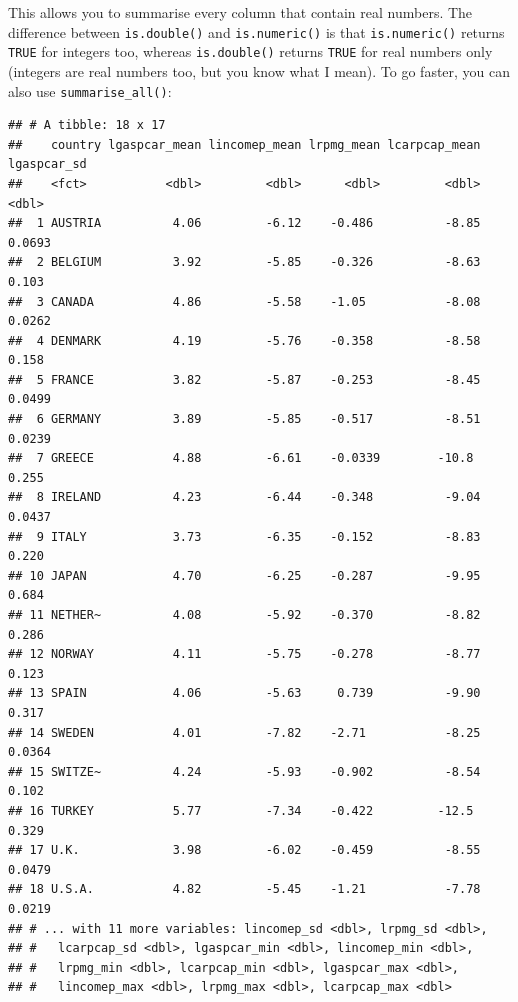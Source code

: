 \documentclass[]{gitbook}
\newenvironment{Shaded}{\begin{snugshade}}{\end{snugshade}}
\newcommand{\KeywordTok}[1]{\textcolor[rgb]{0.13,0.29,0.53}{\textbf{#1}}}
\newcommand{\NormalTok}[1]{#1}
\newcommand{\OperatorTok}[1]{\textcolor[rgb]{0.81,0.36,0.00}{\textbf{#1}}}
\newcommand{\StringTok}[1]{\textcolor[rgb]{0.31,0.60,0.02}{#1}}
\begin{document}
This allows you to summarise every column that contain real numbers. The difference between
\texttt{is.double()} and \texttt{is.numeric()} is that \texttt{is.numeric()} returns \texttt{TRUE} for integers too, whereas
\texttt{is.double()} returns \texttt{TRUE} for real numbers only (integers are real numbers too, but you know
what I mean). To go faster, you can also use \texttt{summarise\_all()}:

\begin{Shaded}
\end{Shaded}

\begin{verbatim}
## # A tibble: 18 x 17
##    country lgaspcar_mean lincomep_mean lrpmg_mean lcarpcap_mean lgaspcar_sd
##    <fct>           <dbl>         <dbl>      <dbl>         <dbl>       <dbl>
##  1 AUSTRIA          4.06         -6.12    -0.486          -8.85      0.0693
##  2 BELGIUM          3.92         -5.85    -0.326          -8.63      0.103 
##  3 CANADA           4.86         -5.58    -1.05           -8.08      0.0262
##  4 DENMARK          4.19         -5.76    -0.358          -8.58      0.158 
##  5 FRANCE           3.82         -5.87    -0.253          -8.45      0.0499
##  6 GERMANY          3.89         -5.85    -0.517          -8.51      0.0239
##  7 GREECE           4.88         -6.61    -0.0339        -10.8       0.255 
##  8 IRELAND          4.23         -6.44    -0.348          -9.04      0.0437
##  9 ITALY            3.73         -6.35    -0.152          -8.83      0.220 
## 10 JAPAN            4.70         -6.25    -0.287          -9.95      0.684 
## 11 NETHER~          4.08         -5.92    -0.370          -8.82      0.286 
## 12 NORWAY           4.11         -5.75    -0.278          -8.77      0.123 
## 13 SPAIN            4.06         -5.63     0.739          -9.90      0.317 
## 14 SWEDEN           4.01         -7.82    -2.71           -8.25      0.0364
## 15 SWITZE~          4.24         -5.93    -0.902          -8.54      0.102 
## 16 TURKEY           5.77         -7.34    -0.422         -12.5       0.329 
## 17 U.K.             3.98         -6.02    -0.459          -8.55      0.0479
## 18 U.S.A.           4.82         -5.45    -1.21           -7.78      0.0219
## # ... with 11 more variables: lincomep_sd <dbl>, lrpmg_sd <dbl>,
## #   lcarpcap_sd <dbl>, lgaspcar_min <dbl>, lincomep_min <dbl>,
## #   lrpmg_min <dbl>, lcarpcap_min <dbl>, lgaspcar_max <dbl>,
## #   lincomep_max <dbl>, lrpmg_max <dbl>, lcarpcap_max <dbl>
\end{verbatim}
\end{document}

